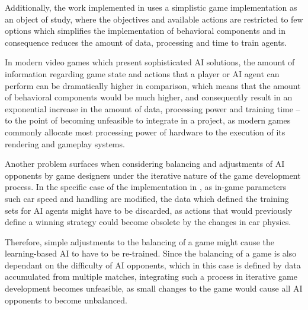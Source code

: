 Additionally, the work implemented in \cite{article_adaptivebehaviorai} uses a simplistic game implementation as an object of study, where the objectives and available actions are restricted to few options which simplifies the implementation of behavioral components and in consequence reduces the amount of data, processing and time to train agents.

In modern video games which present sophisticated AI solutions, the amount of information regarding game state and actions that a player or AI agent can perform can be dramatically higher in comparison, which means that the amount of behavioral components would be much higher, and consequently result in an exponential increase in the amount of data, processing power and training time -- to the point of becoming unfeasible to integrate in a project, as modern games commonly allocate most processing power of hardware to the execution of its rendering and gameplay systems.

Another problem surfaces when considering balancing and adjustments of AI opponents by game designers under the iterative nature of the game development process. In the specific case of the implementation in \cite{article_adaptivebehaviorai}, as in-game parameters such car speed and handling are modified, the data which defined the training sets for AI agents might have to be discarded, as actions that would previously define a winning strategy could become obsolete by the changes in car physics. 

Therefore, simple adjustments to the balancing of a game might cause the learning-based AI to have to be re-trained. Since the balancing of a game is also dependant on the difficulty of AI opponents, which in this case is defined by data accumulated from multiple matches, integrating such a process in iterative game development becomes unfeasible, as small changes to the game would cause all AI opponents to become unbalanced.


